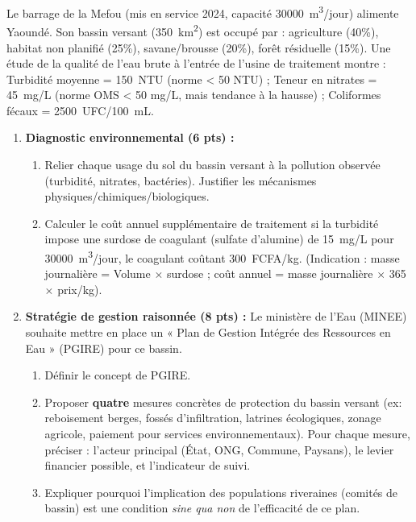 \documentclass[11pt]{article}
\begin{document}
\begin{exercice}
Le barrage de la Mefou (mis en service 2024, capacité \SI{30 000}{m^3/jour}) alimente Yaoundé. Son bassin versant (\SI{350}{km^2}) est occupé par : agriculture (40\%), habitat non planifié (25\%), savane/brousse (20\%), forêt résiduelle (15\%).
Une étude de la qualité de l'eau brute à l'entrée de l'usine de traitement montre : Turbidité moyenne = \SI{150}{NTU} (norme < 50 NTU) ; Teneur en nitrates = \SI{45}{mg/L} (norme OMS < 50 mg/L, mais tendance à la hausse) ; Coliformes fécaux = \SI{2 500}{UFC/100 mL}.

\begin{enumerate}
\item \textbf{Diagnostic environnemental (6 pts) :}
\begin{enumerate}
\item Relier chaque usage du sol du bassin versant à la pollution observée (turbidité, nitrates, bactéries). Justifier les mécanismes physiques/chimiques/biologiques.
\item Calculer le coût annuel supplémentaire de traitement si la turbidité impose une surdose de coagulant (sulfate d'alumine) de \SI{15}{mg/L} pour \SI{30 000}{m^3/jour}, le coagulant coûtant \SI{300}{FCFA/kg}. (Indication : masse journalière = Volume $\times$ surdose ; coût annuel = masse journalière $\times$ 365 $\times$ prix/kg).
\end{enumerate}
\item \textbf{Stratégie de gestion raisonnée (8 pts) :}
Le ministère de l'Eau (MINEE) souhaite mettre en place un « Plan de Gestion Intégrée des Ressources en Eau » (PGIRE) pour ce bassin.
\begin{enumerate}
\item Définir le concept de PGIRE.
\item Proposer \textbf{quatre} mesures concrètes de protection du bassin versant (ex: reboisement berges, fossés d'infiltration, latrines écologiques, zonage agricole, paiement pour services environnementaux). Pour chaque mesure, préciser : l'acteur principal (État, ONG, Commune, Paysans), le levier financier possible, et l'indicateur de suivi.
\item Expliquer pourquoi l'implication des populations riveraines (comités de bassin) est une condition \textit{sine qua non} de l'efficacité de ce plan.
\end{enumerate}
\end{enumerate}
\end{exercice}
\end{document}
